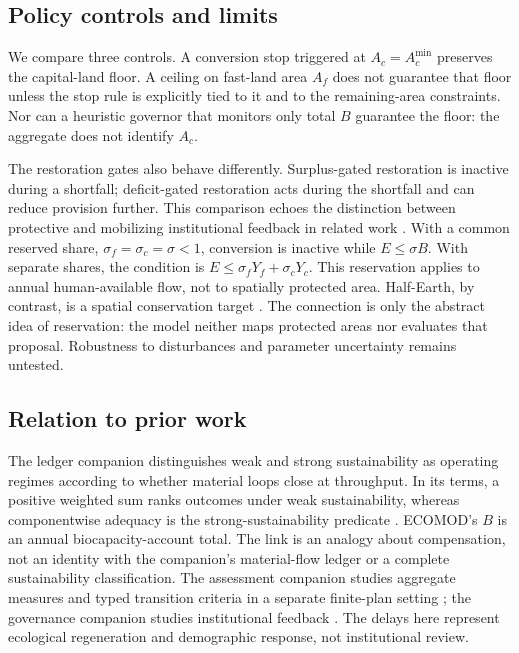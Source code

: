 \documentclass[preprint,12pt,authoryear]{elsarticle}
\newcommand{\Acmin}{A_c^{\min}}
\begin{document}
\subsection{Policy controls and limits}

We compare three controls. A conversion stop triggered at $A_c=\Acmin$ preserves the capital-land floor. A ceiling on fast-land area $A_f$ does not guarantee that floor unless the stop rule is explicitly tied to it and to the remaining-area constraints. Nor can a heuristic governor that monitors only total $B$ guarantee the floor: the aggregate does not identify $A_c$.

The restoration gates also behave differently. Surplus-gated restoration is inactive during a shortfall; deficit-gated restoration acts during the shortfall and can reduce provision further. This comparison echoes the distinction between protective and mobilizing institutional feedback in related work \citep{Abaee2026a}. With a common reserved share, $\sigma_f=\sigma_c=\sigma<1$, conversion is inactive while $E\le\sigma B$. With separate shares, the condition is $E\le\sigma_fY_f+\sigma_cY_c$. This reservation applies to annual human-available flow, not to spatially protected area. Half-Earth, by contrast, is a spatial conservation target \citep{Wilson2016}. The connection is only the abstract idea of reservation: the model neither maps protected areas nor evaluates that proposal. Robustness to disturbances and parameter uncertainty remains untested.

\subsection{Relation to prior work}

The ledger companion distinguishes weak and strong sustainability as operating regimes according to whether material loops close at throughput. In its terms, a positive weighted sum ranks outcomes under weak sustainability, whereas componentwise adequacy is the strong-sustainability predicate \citep[Sections~1.1 and 10.1]{Abaee2026c}. ECOMOD's $B$ is an annual biocapacity-account total. The link is an analogy about compensation, not an identity with the companion's material-flow ledger or a complete sustainability classification. The assessment companion studies aggregate measures and typed transition criteria in a separate finite-plan setting \citep{Abaee2026b}; the governance companion studies institutional feedback \citep{Abaee2026a}. The delays here represent ecological regeneration and demographic response, not institutional review.
\end{document}
